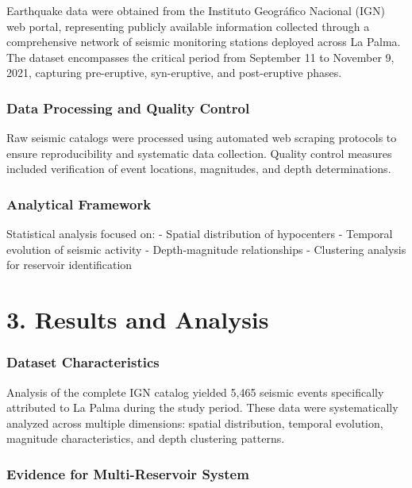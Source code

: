 \documentclass[
  letterpaper,
]{book}
\begin{document}
Earthquake data were obtained from the Instituto Geográfico Nacional
(IGN) web portal, representing publicly available information collected
through a comprehensive network of seismic monitoring stations deployed
across La Palma. The dataset encompasses the critical period from
September 11 to November 9, 2021, capturing pre-eruptive, syn-eruptive,
and post-eruptive phases.

\subsection{Data Processing and Quality
Control}\label{data-processing-and-quality-control}

Raw seismic catalogs were processed using automated web scraping
protocols to ensure reproducibility and systematic data collection.
Quality control measures included verification of event locations,
magnitudes, and depth determinations.

\subsection{Analytical Framework}\label{analytical-framework}

Statistical analysis focused on: - Spatial distribution of hypocenters -
Temporal evolution of seismic activity - Depth-magnitude relationships -
Clustering analysis for reservoir identification


\chapter{3. Results and Analysis}\label{results-and-analysis}

\subsection{Dataset Characteristics}\label{dataset-characteristics}

Analysis of the complete IGN catalog yielded 5,465 seismic events
specifically attributed to La Palma during the study period. These data
were systematically analyzed across multiple dimensions: spatial
distribution, temporal evolution, magnitude characteristics, and depth
clustering patterns.

\subsection{Evidence for Multi-Reservoir
System}\label{evidence-for-multi-reservoir-system}
\end{document}

